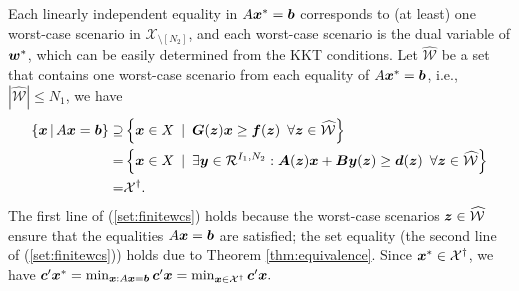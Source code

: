 \documentclass[fleqn,orsc,blindrev]{informs4}
\newcommand{\mb}[1]{\mbox{\boldmath \ensuremath{#1}}}
\begin{document}
\begin{appendices}
{	Each linearly independent equality in $A\mb{x}^* = \mb{b}$ corresponds to (at least) one worst-case scenario in $\mathcal{X}_{\setminus [N_2]}$, and each worst-case scenario is the dual variable of $\mb{w}^*$, which can be easily determined from the KKT conditions. Let $\widehat{\mathcal{W}}$ be a set that contains one worst-case scenario from each equality of $A\mb{x}^* = \mb{b}$, i.e., $|\widehat{\mathcal{W}}| \le N_1$, we have
\begin{equation} \label{set:finitewcs}
	\begin{aligned}
	\left\{ \mb{x} \, | \,  A\mb{x} = \mb{b} \right\}   \supseteq& \left\{ \mb{x} \in X  \enskip | \enskip  \boldsymbol{G}(\boldsymbol{z}) \boldsymbol{x}  \ge \boldsymbol{f} (\boldsymbol{z}) \enskip \forall \boldsymbol{z} \in  \widehat{\mathcal{W}} \right\}\\
	=&  \left\{ \mb{x} \in X  \enskip |  \enskip \exists \mb{y} \in \mathcal{R}^{I_1,N_2}: \mb{A}(\mb{z}) \mb{x}+\mb{B}\mb{y}(\mb{z}) \geq\mb{d}(\mb{z})  \enskip \forall \mb{z} \in  \widehat{\mathcal{W}} \right\}\\
	=&  \mathcal{X}^{\dagger}.
	\end{aligned}
\end{equation}
	The first line of (\ref{set:finitewcs}) holds because the worst-case scenarios $\mb{z} \in \widehat{\mathcal{W}}$ ensure that the equalities $A\mb{x} = \mb{b}$ are satisfied; the set equality (the second line of (\ref{set:finitewcs})) holds due to Theorem \ref{thm:equivalence}. Since  $\mb{x}^* \in \mathcal{X}^{\dagger}$, we have
	$
	\mb{c}'\mb{x}^* = \min_{\boldsymbol{x} : A \boldsymbol{x} = \boldsymbol{b}} \mb{c}'\mb{x} = \min_{\boldsymbol{x} \in \mathcal{X}^{\dagger}} \mb{c}'\mb{x}.
	$ \hfill \Halmos
\fi

}\newpage
	

\end{appendices}
\end{document}

